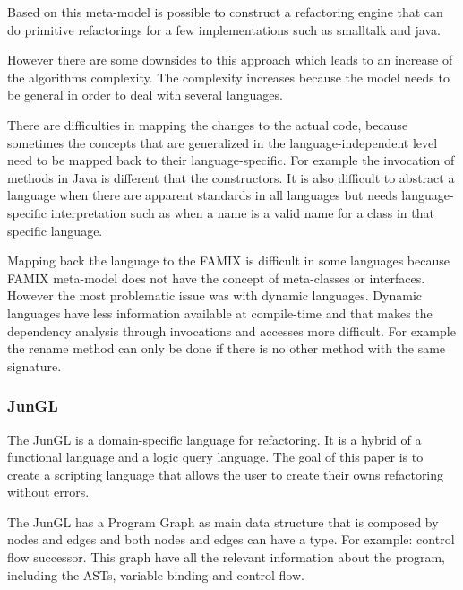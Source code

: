 Based on this meta-model is possible to construct a refactoring engine that can do primitive refactorings for a few implementations such as smalltalk and java.

However there are some downsides to this approach which leads to an increase of the algorithms complexity. 
The complexity increases because the model needs to be general in order to deal with several languages. 

There are difficulties in mapping the changes to the actual code, because sometimes the concepts that are generalized in the language-independent level need to be mapped back to their language-specific.
For example the invocation of methods in Java is different that the constructors.
It is also difficult to abstract a language when there are apparent standards in all languages but needs language-specific interpretation such as when a name is a valid name for a class in that specific language.

Mapping back the language to the FAMIX is difficult in some languages because FAMIX meta-model does not have the concept of meta-classes or interfaces.
However the most problematic issue was with dynamic languages. Dynamic languages have less information available at compile-time and that makes the dependency analysis  through invocations and accesses more difficult. For example the rename method can only be done if there is no other method with the same signature.

\subsubsection{JunGL} %


The JunGL \cite{verbaere2006jungl} is a domain-specific language for refactoring. 
It is a hybrid of a functional language and a logic query language. 
The goal of this paper is to create a scripting language that allows the user to create their owns refactoring without errors.

The JunGL has a Program Graph as main data structure that is composed by nodes and edges and both nodes and edges can have a type. 
For example: control flow successor. 
This graph have all the relevant information about the program, including the ASTs, variable binding and control flow.

